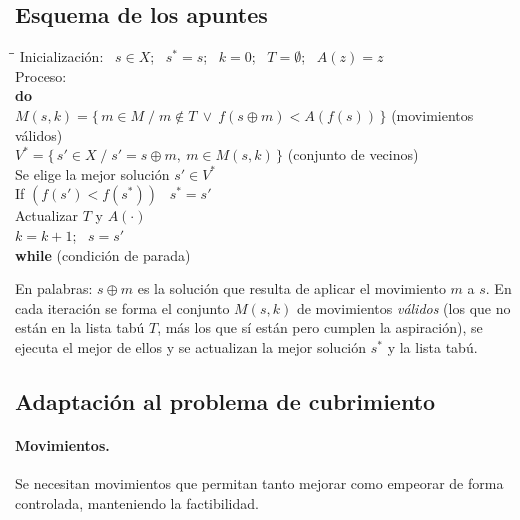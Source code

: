 \subsection{Esquema de los apuntes}

\begin{apuntes}
\begin{tabbing}
\quad\=\quad\=\kill
Inicialización: \ $s\in X$; \ $s^\ast=s$; \ $k=0$; \ $T=\emptyset$; \ $A(z)=z$\\
Proceso:\\
\> \textbf{do}\\
\>\> $M(s,k)=\{\,m\in M \;/\; m\notin T \ \vee\ f(s\oplus m)<A(f(s))\,\}$ \quad (movimientos válidos)\\
\>\> $V^\ast=\{\,s'\in X \;/\; s'=s\oplus m,\ m\in M(s,k)\,\}$ \quad (conjunto de vecinos)\\
\>\> Se elige la mejor solución $s'\in V^\ast$\\
\>\> If $(f(s')<f(s^\ast))$ \ $s^\ast=s'$\\
\>\> Actualizar $T$ y $A(\cdot)$\\
\>\> $k=k+1$; \ $s=s'$\\
\> \textbf{while} (condición de parada)
\end{tabbing}
\end{apuntes}

En palabras: $s\oplus m$ es la solución que resulta de aplicar el movimiento $m$ a $s$. En
cada iteración se forma el conjunto $M(s,k)$ de movimientos \emph{válidos} (los que no están
en la lista tabú $T$, más los que sí están pero cumplen la aspiración), se ejecuta el mejor
de ellos y se actualizan la mejor solución $s^\ast$ y la lista tabú.

\subsection{Adaptación al problema de cubrimiento}

\paragraph{Movimientos.} Se necesitan movimientos que permitan tanto mejorar como empeorar de
forma controlada, manteniendo la factibilidad.


